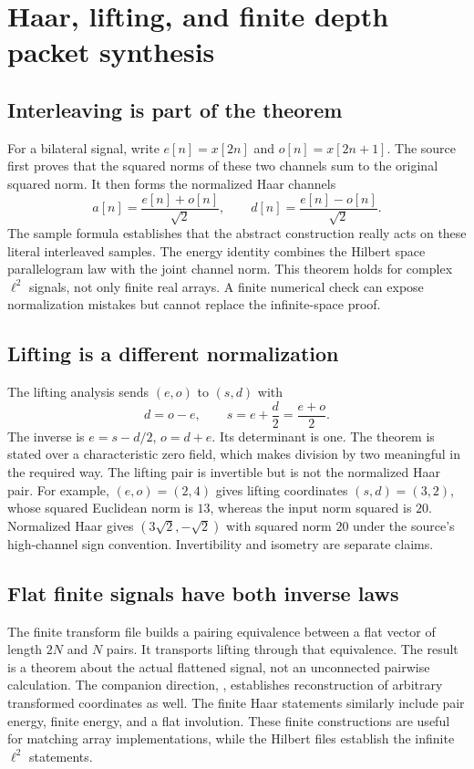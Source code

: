 \section{Haar, lifting, and finite depth packet synthesis}
\subsection{Interleaving is part of the theorem}
For a bilateral signal, write $e[n]=x[2n]$ and $o[n]=x[2n+1]$. The source first proves that the squared norms of these two channels sum to the original squared norm. It then forms the normalized Haar channels
\[
a[n]=\frac{e[n]+o[n]}{\sqrt2},\qquad d[n]=\frac{e[n]-o[n]}{\sqrt2}.
\]
The sample formula establishes that the abstract construction really acts on these literal interleaved samples.
The energy identity combines the Hilbert space parallelogram law with the joint channel norm.
This theorem holds for complex $\ell^2$ signals, not only finite real arrays. A finite numerical check can expose normalization mistakes but cannot replace the infinite-space proof.

\subsection{Lifting is a different normalization}
The lifting analysis sends $(e,o)$ to $(s,d)$ with
\[
d=o-e,\qquad s=e+\frac d2=\frac{e+o}{2}.
\]
The inverse is $e=s-d/2$, $o=d+e$. Its determinant is one. The theorem is stated over a characteristic zero field, which makes division by two meaningful in the required way.
The lifting pair is invertible but is not the normalized Haar pair. For example, $(e,o)=(2,4)$ gives lifting coordinates $(s,d)=(3,2)$, whose squared Euclidean norm is $13$, whereas the input norm squared is $20$. Normalized Haar gives $(3\sqrt2,-\sqrt2)$ with squared norm $20$ under the source's high-channel sign convention. Invertibility and isometry are separate claims.

\subsection{Flat finite signals have both inverse laws}
The finite transform file builds a pairing equivalence between a flat vector of length $2N$ and $N$ pairs. It transports lifting through that equivalence. The result is a theorem about the actual flattened signal, not an unconnected pairwise calculation.
The companion direction, , establishes reconstruction of arbitrary transformed coordinates as well. The finite Haar statements similarly include pair energy, finite energy, and a flat involution. These finite constructions are useful for matching array implementations, while the Hilbert files establish the infinite $\ell^2$ statements.

